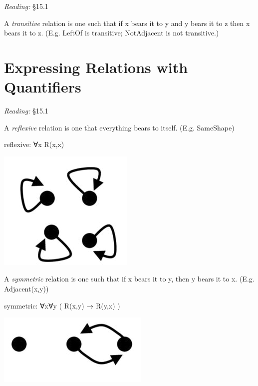 \documentclass[12pt]{extarticle}
\begin{document}
\begin{multicols*}{3}
\emph{Reading:} §15.1
 
A \emph{transitive} relation is one such that if x bears it to y and y bears it to z then x bears it to z. (E.g. LeftOf is transitive; NotAdjacent is not transitive.)
 
 
 \columnbreak
 
\section{Expressing Relations with Quantifiers}
 
\emph{Reading:} §15.1
 
\begin{minipage}{\columnwidth}
 
A \emph{reflexive} relation is one that everything bears to itself. (E.g. SameShape)
 
reflexive: ∀x R(x,x)
 
\begin{center}
\includegraphics[scale=0.3]{img/reflexive.png}
\end{center}
\end{minipage}
 
\begin{minipage}{\columnwidth}
 
A \emph{symmetric} relation is one such that if x bears it to y, then y bears it to x. (E.g. Adjacent(x,y))
 
symmetric: ∀x∀y ( R(x,y) → R(y,x) )
 
\begin{center}
\includegraphics[scale=0.3]{img/symmetric.png}
\end{center}
\end{minipage}
 

\end{multicols*}
\end{document}
